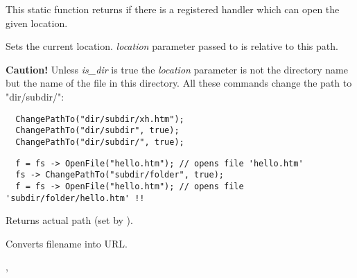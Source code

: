 This static function returns \true if there is a registered handler which can open the given
location.


\label{wxfilesystemchangepathto}


Sets the current location. {\it location} parameter passed to 
 is relative to this path.

{\bf Caution! } Unless {\it is\_dir} is true the {\it location} parameter
is not the directory name but the name of the file in this directory. All these
commands change the path to "dir/subdir/":

\begin{verbatim}
  ChangePathTo("dir/subdir/xh.htm");
  ChangePathTo("dir/subdir", true);
  ChangePathTo("dir/subdir/", true);
\end{verbatim}





\begin{verbatim}
  f = fs -> OpenFile("hello.htm"); // opens file 'hello.htm'
  fs -> ChangePathTo("subdir/folder", true);
  f = fs -> OpenFile("hello.htm"); // opens file 'subdir/folder/hello.htm' !!
\end{verbatim}


\label{wxfilesystemgetpath}


Returns actual path (set by ).


\label{wxfilesystemfilenametourl}


Converts filename into URL.


,


